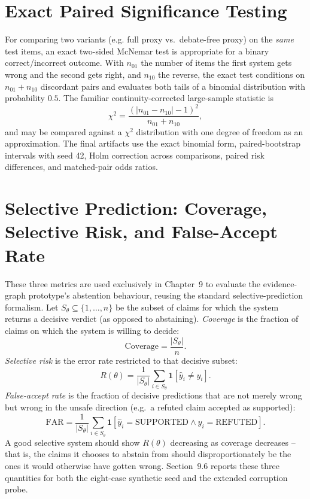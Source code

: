 \documentclass[12pt,a4paper,openany]{report}
\begin{document}
\section{Exact Paired Significance Testing}
For comparing two variants (e.g. full proxy vs.\ debate-free proxy) on the \emph{same} test items, an exact two-sided McNemar test is appropriate for a binary correct/incorrect outcome. With $n_{01}$ the number of items the first system gets wrong and the second gets right, and $n_{10}$ the reverse, the exact test conditions on $n_{01}+n_{10}$ discordant pairs and evaluates both tails of a binomial distribution with probability $0.5$. The familiar continuity-corrected large-sample statistic is
\[
\chi^2 = \frac{(|n_{01}-n_{10}|-1)^2}{n_{01}+n_{10}},
\]
and may be compared against a $\chi^2$ distribution with one degree of freedom as an approximation. The final artifacts use the exact binomial form, paired-bootstrap intervals with seed 42, Holm correction across comparisons, paired risk differences, and matched-pair odds ratios.

\section{Selective Prediction: Coverage, Selective Risk, and False-Accept Rate}
\label{sec:selective-defs}
These three metrics are used exclusively in Chapter~9 to evaluate the evidence-graph prototype's abstention behaviour, reusing the standard selective-prediction formalism. Let $S_\theta \subseteq \{1,\ldots,n\}$ be the subset of claims for which the system returns a decisive verdict (as opposed to abstaining). \emph{Coverage} is the fraction of claims on which the system is willing to decide:
\[
\mathrm{Coverage} = \frac{|S_\theta|}{n}.
\]
\emph{Selective risk} is the error rate restricted to that decisive subset:
\[
R(\theta) = \frac{1}{|S_\theta|}\sum_{i \in S_\theta} \mathbf{1}[\hat y_i \ne y_i].
\]
\emph{False-accept rate} is the fraction of decisive predictions that are not merely wrong but wrong in the unsafe direction (e.g.\ a refuted claim accepted as supported):
\[
\mathrm{FAR} = \frac{1}{|S_\theta|}\sum_{i \in S_\theta} \mathbf{1}[\hat y_i = \mathrm{SUPPORTED} \wedge y_i = \mathrm{REFUTED}].
\]
A good selective system should show $R(\theta)$ decreasing as coverage decreases -- that is, the claims it chooses to abstain from should disproportionately be the ones it would otherwise have gotten wrong. Section~9.6 reports these three quantities for both the eight-case synthetic seed and the extended corruption probe.
\end{document}
